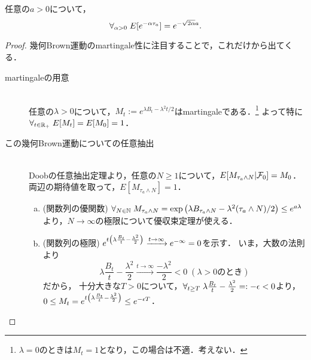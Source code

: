 \documentclass[uplatex,dvipdfmx]{jsreport}
\begin{document}
\begin{proposition}\label{prop-hitting-time}
    任意の$a>0$について，
    \[\forall_{\alpha>0}\;E[e^{-\alpha\tau_a}]=e^{-\sqrt{2\alpha}a}.\]
\end{proposition}
\begin{proof}
    幾何Brown運動のmartingale性に注目することで，これだけから出てくる．
    \begin{description}
        \item[martingaleの用意] \mbox{}\\
        任意の$\lambda>0$について，$M_t:=e^{\lambda B_t-\lambda^2t/2}$はmartingaleである．\footnote{$\lambda=0$のときは$M_t=1$となり，この場合は不適．考えない．}
        よって特に$\forall_{t\in\mathbb{R}_+}\;E[M_t]=E[M_0]=1$．
        \item[この幾何Brown運動についての任意抽出] \mbox{}\\
        Doobの任意抽出定理より，任意の$N\ge 1$について，$E[M_{\tau_a\land N}|\mathcal{F}_0]=M_0$．両辺の期待値を取って，$E[M_{\tau_a\land N}]=1$．
        \begin{enumerate}[(a)]
            \item (関数列の優関数)  $\forall_{N\in\mathbb{N}}\;M_{\tau_a\land N}=\exp\left(\lambda B_{\tau_a\land N}-\lambda^2(\tau_a\land N)/2\right)\le e^{a\lambda}$より，$N\to\infty$の極限について優収束定理が使える．
            \item (関数列の極限) $e^{t\left(\lambda\frac{B_t}{t}-\frac{\lambda^2}{2}\right)}\xrightarrow{t\to\infty}e^{-\infty}=0$を示す．
            いま，大数の法則より\[\lambda\frac{B_t}{t}-\frac{\lambda^2}{2}\xrightarrow{t\to\infty}\frac{-\lambda^2}{2}<0\;(\lambda>0\text{のとき})\]だから，
            十分大きな$T>0$について，$\forall_{t\ge T}\;\lambda\frac{B_t}{t}-\frac{\lambda^2}{2}=:-\epsilon<0$より，$0\le M_t=e^{t\left(\lambda\frac{B_t}{t}-\frac{\lambda^2}{2}\right)}\le e^{-\epsilon T}$．
            

\end{enumerate}
\end{description}
\end{proof}
\end{document}
